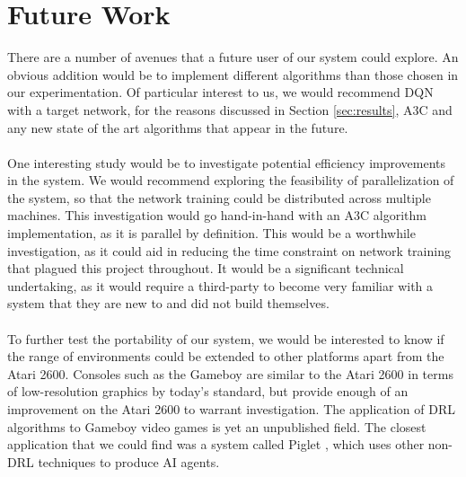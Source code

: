 \section{Future Work}
There are a number of avenues that a future user of our system could explore. An obvious addition would be to implement different algorithms than those chosen in our experimentation. Of particular interest to us, we would recommend DQN with a target network, for the reasons discussed in Section \ref{sec:results}, A3C and any new state of the art algorithms that appear in the future. \paragraph{}

One interesting study would be to investigate potential efficiency improvements in the system. We would recommend exploring the feasibility of parallelization of the system, so that the network training could be distributed across multiple machines. This investigation would go hand-in-hand with an A3C algorithm implementation, as it is parallel by definition. This would be a worthwhile investigation, as it could aid in reducing the time constraint on network training that plagued this project throughout. It would be a significant technical undertaking, as it would require a third-party to become very familiar with a system that they are new to and did not build themselves. \paragraph{}

To further test the portability of our system, we would be interested to know if the range of environments could be extended to other platforms apart from the Atari 2600. Consoles such as the Gameboy \cite{gameboy} are similar to the Atari 2600 in terms of low-resolution graphics by today's standard, but provide enough of an improvement on the Atari 2600 to warrant investigation. The application of DRL algorithms to Gameboy video games is yet an unpublished field. The closest application that we could find was a system called Piglet \cite{piglet}, which uses other non-DRL techniques to produce AI agents.
